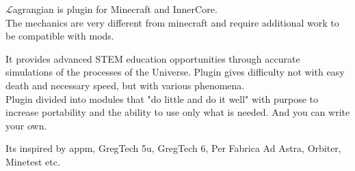\documentclass[12pt]{article}
\begin{document}
    $\mathcal{L}$agrangian is plugin for Minecraft and InnerCore. \\
    
    The mechanics are very different from minecraft and require additional work to be compatible with mods.

    It provides advanced STEM education opportunities through accurate simulations of the processes of the Universe. Plugin gives difficulty not with easy death and necessary speed, but with various phenomena. \\
    Plugin divided into modules that "do little and do it well" with purpose to increase portability and the ability to use only what is needed. And you can write your own.

    Its inspired by appm, GregTech 5u, GregTech 6, Per Fabrica Ad Astra, Orbiter, Minetest etc.
\end{document}
